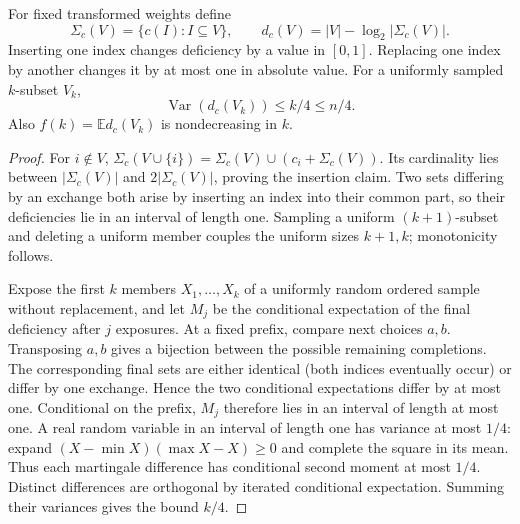 \begin{lemma}\label{lem:deficiency}
For fixed transformed weights define
\[
 \Sigma_c(V)=\{c(I):I\subseteq V\},\qquad
 d_c(V)=|V|-\log_2|\Sigma_c(V)|.
\]
Inserting one index changes deficiency by a value in $[0,1]$.
Replacing one index by another changes it by at most one in absolute
value. For a uniformly sampled $k$-subset $V_k$,
\[
 \operatorname{Var}(d_c(V_k))\le k/4\le n/4.
\]
Also $f(k)=\mathbb E d_c(V_k)$ is nondecreasing in $k$.
\end{lemma}
\begin{proof}
For $i\notin V$,
$\Sigma_c(V\cup\{i\})=\Sigma_c(V)\cup(c_i+\Sigma_c(V))$.
Its cardinality lies between $|\Sigma_c(V)|$ and
$2|\Sigma_c(V)|$, proving the insertion claim. Two sets differing
by an exchange both arise by inserting an index into their common
part, so their deficiencies lie in an interval of length one.
Sampling a uniform $(k+1)$-subset and deleting a uniform member
couples the uniform sizes $k+1,k$; monotonicity follows.

Expose the first $k$ members $X_1,\ldots,X_k$ of a uniformly random
ordered sample without replacement, and let $M_j$ be the conditional
expectation of the final deficiency after $j$ exposures. At a fixed
prefix, compare next choices $a,b$. Transposing $a,b$ gives a bijection
between the possible remaining completions. The corresponding final
sets are either identical (both indices eventually occur) or differ
by one exchange. Hence the two conditional expectations differ by at
most one. Conditional on the prefix, $M_j$ therefore lies in an
interval of length at most one. A real random variable in an interval
of length one has variance at most $1/4$: expand
$(X-\min X)(\max X-X)\ge0$ and complete the square in its mean.
Thus each martingale difference has conditional second moment at most
$1/4$. Distinct differences are orthogonal by iterated conditional
expectation. Summing their variances gives the bound $k/4$.
\end{proof}

